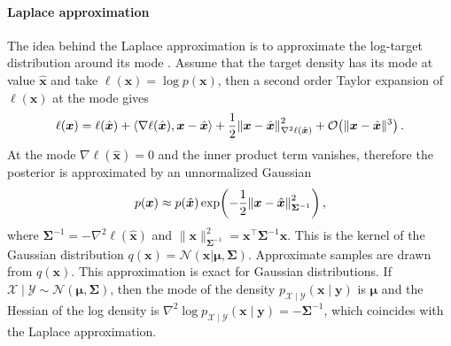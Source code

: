 \paragraph{Laplace approximation}
The idea behind the Laplace approximation is to approximate the log-target distribution around its mode \citep{mackay2003information}. 
Assume that the target density has its mode at value $\hat{\boldsymbol{x}}$ and take $\ell(\boldsymbol{x})= \log p(\boldsymbol{x})$, then a second order Taylor expansion of $\ell(\boldsymbol{x})$ at the mode gives
\begin{equation}
    \ell(\boldsymbol{x})
    = \ell(\hat{\boldsymbol{x}})    
    + \left\langle  \nabla\ell(\hat{\boldsymbol{x}}), \boldsymbol{x}-\hat{\boldsymbol{x}} \right\rangle
    + \frac{1}{2}\norm{\boldsymbol{x}-\hat{\boldsymbol{x}} }^2_{\nabla^2 \ell(\hat{\boldsymbol{x}})}    
    + \mathcal{O}\!\left(\|\boldsymbol{x}-\hat{\boldsymbol{x}}\|^3\right).
\end{equation}
At the mode $\nabla\ell(\hat{\boldsymbol{x}})=0$ and the
 inner product term vanishes, therefore the posterior is approximated by an unnormalized  Gaussian
 \begin{equation}
    p(\boldsymbol{x}) \approx p(\hat{\boldsymbol{x}})
    \exp\!\left(
    -\frac{1}{2} \norm{\boldsymbol{x}-\hat{\boldsymbol{x}} }^2_{\mathbf{\Sigma}^{-1}}   
    \right),
\end{equation}
where $\mathbf{\Sigma}^{-1} = -\nabla^2 \ell(\hat{\boldsymbol{x}})$ and $\|\boldsymbol{x}\|^2_{ \mathbf{\Sigma}^{-1}} = \boldsymbol{x}^\top \mathbf{\Sigma}^{-1} \boldsymbol{x}$.
This is the kernel of the Gaussian distribution $q(\boldsymbol{x}) = \mathcal{N}(\boldsymbol{x}|\boldsymbol{\mu}, \mathbf{\Sigma})$.
Approximate samples are drawn from $q(\boldsymbol{x})$. This approximation is exact for Gaussian distributions. If  $\mathcal{X}\mid \mathcal{Y} \sim\mathcal{N}(\boldsymbol{\mu},\mathbf{\Sigma})$, then the mode of the density $p_{\mathcal{X}\mid \mathcal{Y}}(\boldsymbol{x}\mid \boldsymbol{y})$ is $\boldsymbol{\mu}$ and the Hessian of the log density is $\nabla^2\log p_{\mathcal{X}\mid \mathcal{Y}}(\boldsymbol{x}\mid \boldsymbol{y}) = -\mathbf{\Sigma}^{-1}$, which coincides with the Laplace approximation. 

